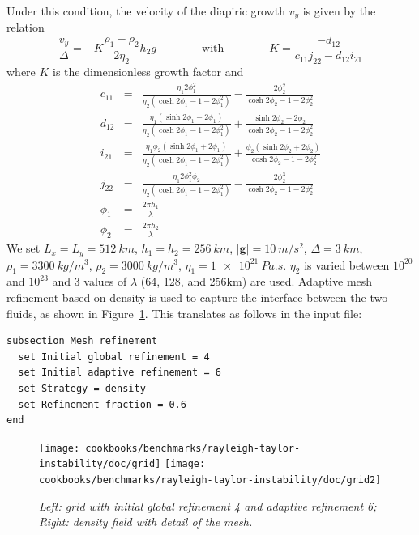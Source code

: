 \documentclass{article}
\begin{document}
Under this condition, the velocity of the diapiric growth
$v_y$ is given by the relation
\begin{equation}
\frac{v_y}{\Delta} = - K \frac{\rho_1-\rho_2}{2 \eta_2} h_2 g
\qquad
\qquad
\text{with}
\qquad
\qquad
K=\frac{-d_{12}}{c_{11}j_{22}-d_{12}i_{21}}
\end{equation}
where $K$ is the dimensionless growth factor and
\begin{eqnarray}
c_{11} &=& \frac{\eta_1 2 \phi_1^2}{\eta_2(\cosh 2\phi_1 - 1 - 2\phi_1^2)} - \frac{2\phi_2^2}{\cosh 2\phi_2 - 1 - 2 \phi_2^2}\\
d_{12} &=& \frac{\eta_1(\sinh 2\phi_1 -2\phi_1)}{\eta_2(\cosh 2\phi_1 -1 -2\phi_1^2)} + \frac{\sinh 2\phi_2 - 2\phi_2}{\cosh 2\phi_2 -1 -2\phi_2^2} \\
i_{21} &=& \frac{\eta_1\phi_2 (\sinh 2 \phi_1 + 2 \phi_1)}{\eta_2(\cosh 2\phi_1 -1 -2\phi_1^2)}
+ \frac{\phi_2 (\sinh 2\phi_2 + 2\phi_2)}{\cosh 2\phi_2 -1 -2\phi_2^2} \\
j_{22} &=& \frac{\eta_1 2 \phi_1^2 \phi_2}{\eta_2(\cosh 2\phi_1 -1-2\phi_1^2)} - \frac{2\phi_2^3}{ \cosh 2\phi_2 -1 -2\phi_2^2}\\
\phi_1&=&\frac{2\pi h_1}{\lambda} \\
\phi_2&=&\frac{2\pi h_2}{\lambda}
\end{eqnarray}
We set $L_x=L_y=\SI{512}{km}$, $h_1=h_2=\SI{256}{km}$, $|\boldsymbol{g}|=\SI{10}{m/s^2}$, $\Delta=\SI{3}{km}$,
$\rho_1=\SI{3300}{kg/m^3}$, $\rho_2=\SI{3000}{kg/m^3}$, $\eta_1=\SI{1e21}{Pa.s}$. $\eta_2$ is varied between $10^{20}$ and $10^{23}$
and 3 values of $\lambda$ (64, 128, and 256km) are used.
Adaptive mesh refinement based on density is used to capture the interface between the two
fluids, as shown in Figure~\ref{fig:RTi_grids}. This translates as follows in the input file:
\begin{verbatim}
subsection Mesh refinement
  set Initial global refinement = 4
  set Initial adaptive refinement = 6
  set Strategy = density
  set Refinement fraction = 0.6
end
\end{verbatim}

\begin{figure}
  \centering
  \texttt{[image: cookbooks/benchmarks/rayleigh-taylor-instability/doc/grid]}
  \texttt{[image: cookbooks/benchmarks/rayleigh-taylor-instability/doc/grid2]}
  \caption{\it Left: grid with initial global refinement 4 and adaptive refinement 6; Right: density field with detail of the mesh.}
  \label{fig:RTi_grids}
\end{figure}
\end{document}
